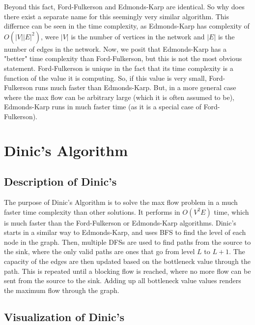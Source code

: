 \documentclass{report}
\begin{document}
Beyond this fact, Ford-Fulkerson and Edmonds-Karp are identical. So why does there exist a separate name for this seemingly very similar algorithm. This differnce can be seen in the time complexity, as Edmonds-Karp has complexity of $O(|V||E|^2)$, were $|V|$ is the number of vertices in the network and $|E|$ is the number of edges in the network. Now, we posit that Edmonds-Karp has a "better" time complexity than Ford-Fulkerson, but this is not the most obvious statement. Ford-Fulkerson is unique in the fact that its time complexity is a function of the value it is computing. So, if this value is very small, Ford-Fulkerson runs much faster than Edmonds-Karp. But, in a more general case where the max flow can be arbitrary large (which it is often assumed to be), Edmonds-Karp runs in much faster time (as it is a special case of Ford-Fulkerson).

\chapter{Dinic's Algorithm}
\section{Description of Dinic's}
The purpose of Dinic's Algorithm is to solve the max flow problem in a much faster time complexity than other solutions. It performs in $O\left(V^{2}E\right)$ time, which is much faster than the Ford-Fulkerson or Edmonds-Karp algorithms. Dinic's starts in a similar way to Edmonds-Karp, and uses BFS to find the level of each node in the graph. Then, multiple DFSs are used to find paths from the source to the sink, where the only valid paths are ones that go from level $L$ to $L + 1$. The capacity of the edges are then updated based on the bottleneck value through the path. This is repeated until a blocking flow is reached, where no more flow can be sent from the source to the sink. Adding up all bottleneck value values renders the maximum flow through the graph.

\pagebreak

\section{Visualization of Dinic's}
\end{document}
